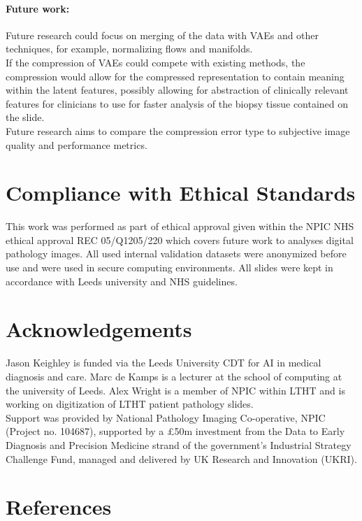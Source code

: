 \documentclass[review]{elsarticle}
\begin{document}
\paragraph{Future work:} Future research could focus on merging of the data with VAEs and other techniques, for example, normalizing flows and manifolds. \\
If the compression of VAEs could compete with existing methods, the compression would allow for the compressed representation to contain meaning within the latent features, possibly allowing for abstraction of clinically relevant features for clinicians to use for faster analysis of the biopsy tissue contained on the slide. \\
Future research aims to compare the compression error type to subjective image quality and performance metrics. \\

\section{Compliance with Ethical Standards}
This work was performed as part of ethical approval given within the NPIC NHS ethical approval REC 05/Q1205/220 which covers future work to analyses digital pathology images.
All used internal validation datasets were anonymized before use and were used in secure computing environments. All slides were kept in accordance with Leeds university and NHS guidelines. 

\section{Acknowledgements}
Jason Keighley is funded via the Leeds University CDT for AI in medical diagnosis and care. Marc de Kamps is a lecturer at the school of computing at the university of Leeds. Alex Wright is a member of NPIC within LTHT and is working on digitization of LTHT patient pathology slides. \\
Support was provided by National Pathology Imaging Co-operative, NPIC (Project no. 104687), supported by a £50m investment from the Data to Early Diagnosis and Precision Medicine strand of the government’s Industrial Strategy Challenge Fund, managed and delivered by UK Research and Innovation (UKRI). \\

\section{References}
\end{document}
